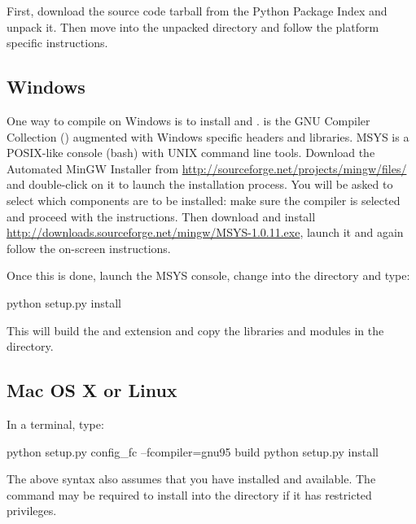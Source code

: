 \documentclass[]{jss}
\begin{document}
First, download the source code tarball from the Python Package Index and unpack it. Then move
into the unpacked directory and follow the platform specific instructions.



\subsection{Windows}
  \label{windows}%


One way to compile  on Windows is to install  \citep{mingw} and  \citep{msys}.  is
the GNU Compiler Collection () augmented with Windows specific headers and
libraries. MSYS is a POSIX-like console (bash) with UNIX command line tools.
Download the Automated MinGW Installer from \href{http://sourceforge.net/projects/mingw/files/}{http://sourceforge.net/projects/mingw/files/} and double-click on it to launch
the installation process. You will be asked to select which
components are to be installed: make sure the  \citep{gcc} compiler is selected and
proceed with the instructions. Then download and install \href{http://downloads.sourceforge.net/mingw/MSYS-1.0.11.exe}{http://downloads.sourceforge.net/mingw/MSYS-1.0.11.exe},
launch it and again follow the on-screen instructions.

Once this is done, launch the MSYS console, change into the  directory and
type:
\begin{CodeInput}
python setup.py install
\end{CodeInput}

This will build the  and  extension and copy the libraries and  
modules in the  directory.



\subsection{Mac OS X or Linux}
  \label{mac-os-x-or-linux}%


In a terminal, type:
\begin{CodeInput}
python setup.py config_fc --fcompiler=gnu95 build
python setup.py install
\end{CodeInput}

The above syntax also assumes that you have  installed and available. The
 command may be required to install  into the  
directory if it has restricted privileges.
\end{document}
